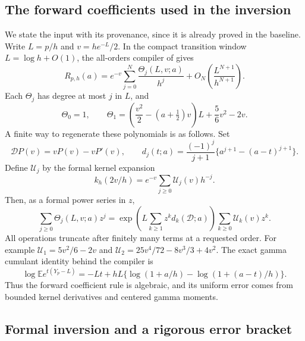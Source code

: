 \documentclass[11pt,a4paper]{article}
\numberwithin{equation}{section}
\theoremstyle{plain}
\theoremstyle{definition}
\theoremstyle{remark}
\newcommand{\src}[1]{\nolinkurl{#1}}
\begin{document}
\subsection{The forward coefficients used in the inversion}

We state the input with its provenance, since it is already proved in
the baseline. Write $L=p/h$ and $v=he^{-L}/2$. In the compact
transition window $L=\log h+O(1)$, the all-orders compiler of
\cite[\src{chapters/04-depth.tex}, Theorem
\texttt{harmonic:thm:allorders}]{cont:ProveIt} gives
\begin{equation}\label{us:eq:forward}
 R_{p,h}(a)=e^{-v}
    \sum_{j=0}^N\frac{\Theta_j(L,v;a)}{h^j}
       +O_N\!\left(\frac{L^{N+1}}{h^{N+1}}\right).
\end{equation}
Each $\Theta_j$ has degree at most $j$ in $L$, and
\begin{equation}\label{us:eq:Theta1}
 \Theta_0=1,
 \qquad
 \Theta_1=\left(\frac{v^2}{2}-(a+\tfrac12)v\right)L
              +\frac56v^2-2v.
\end{equation}
A finite way to regenerate these polynomials is as follows. Set
\[
 \mathcal D P(v)=vP(v)-vP'(v),\qquad
 d_j(t;a)=\frac{(-1)^j}{j+1}
                \{a^{j+1}-(a-t)^{j+1}\}.
\]
Define $\mathcal U_j$ by the formal kernel expansion
\[
 k_h(2v/h)=e^{-v}\sum_{j\ge0}\mathcal U_j(v)h^{-j}.
\]
Then, as a formal power series in $z$,
\begin{equation}\label{us:eq:forward-recipe}
 \sum_{j\ge0}\Theta_j(L,v;a)z^j
 =\exp\!\left(L\sum_{k\ge1}z^k d_k(\mathcal D;a)\right)
       \sum_{k\ge0}\mathcal U_k(v)z^k.
\end{equation}
All operations truncate after finitely many terms at a requested
order. For example
$\mathcal U_1=5v^2/6-2v$ and
$\mathcal U_2=25v^4/72-8v^3/3+4v^2$.
The exact gamma cumulant identity behind the compiler is
\[
 \log\mathbb E e^{t(Y_p-L)}
 =-Lt+hL\{\log(1+a/h)-\log(1+(a-t)/h)\}.
\]
Thus the forward coefficient rule is algebraic, and its uniform
error comes from bounded kernel derivatives and centered gamma moments.

\subsection{Formal inversion and a rigorous error bracket}
\end{document}
